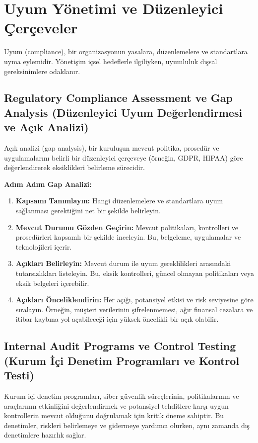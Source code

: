\section{Uyum Yönetimi ve Düzenleyici Çerçeveler}

Uyum (compliance), bir organizasyonun yasalara, düzenlemelere ve standartlara uyma eylemidir. Yönetişim içsel hedeflerle ilgiliyken, uyumluluk dışsal gereksinimlere odaklanır.

\subsection{Regulatory Compliance Assessment ve Gap Analysis (Düzenleyici Uyum Değerlendirmesi ve Açık Analizi)}

Açık analizi (gap analysis), bir kuruluşun mevcut politika, prosedür ve uygulamalarını belirli bir düzenleyici çerçeveye (örneğin, GDPR, HIPAA) göre değerlendirerek eksiklikleri belirleme sürecidir.

\textbf{Adım Adım Gap Analizi:}
\begin{enumerate}
    \item \textbf{Kapsamı Tanımlayın:} Hangi düzenlemelere ve standartlara uyum sağlanması gerektiğini net bir şekilde belirleyin.
    \item \textbf{Mevcut Durumu Gözden Geçirin:} Mevcut politikaları, kontrolleri ve prosedürleri kapsamlı bir şekilde inceleyin. Bu, belgeleme, uygulamalar ve teknolojileri içerir.
    \item \textbf{Açıkları Belirleyin:} Mevcut durum ile uyum gereklilikleri arasındaki tutarsızlıkları listeleyin. Bu, eksik kontrolleri, güncel olmayan politikaları veya eksik belgeleri içerebilir.
    \item \textbf{Açıkları Önceliklendirin:} Her açığı, potansiyel etkisi ve risk seviyesine göre sıralayın. Örneğin, müşteri verilerinin şifrelenmemesi, ağır finansal cezalara ve itibar kaybına yol açabileceği için yüksek öncelikli bir açık olabilir.
\end{enumerate}

\subsection{Internal Audit Programs ve Control Testing (Kurum İçi Denetim Programları ve Kontrol Testi)}

Kurum içi denetim programları, siber güvenlik süreçlerinin, politikalarının ve araçlarının etkinliğini değerlendirmek ve potansiyel tehditlere karşı uygun kontrollerin mevcut olduğunu doğrulamak için kritik öneme sahiptir. Bu denetimler, riskleri belirlemeye ve gidermeye yardımcı olurken, aynı zamanda dış denetimlere hazırlık sağlar.

